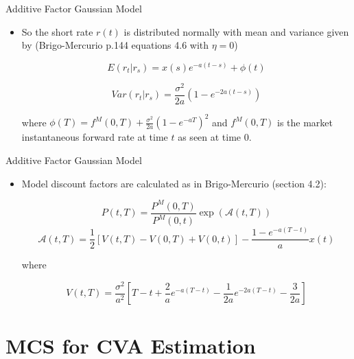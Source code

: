\documentclass[11pt]{beamer}
\begin{document}
\begin{frame}{Additive Factor Gaussian Model}
\begin{itemize}
\item So the short rate $r(t)$ is distributed normally with mean and variance given by (Brigo-Mercurio p.144 equations 4.6 with $\eta = 0$)

$$
E(r_t \vert r_s)= x(s) e^{-a(t-s)} + \phi(t)
$$

$$
Var(r_t \vert r_s) = \frac{\sigma^2}{2a} \left( 1-e^{-2a(t-s)} \right)
$$

where $\phi(T) = f^M(0,T) + \frac{\sigma^2}{2a} \left( 1-e^{-aT} \right)^2$ and $f^M(0,T)$ is the market instantaneous forward rate at time $t$ as seen at time $0$.
\end{itemize}
\end{frame}
\begin{frame}{Additive Factor Gaussian Model}
\begin{itemize}
\item Model discount factors are calculated as in Brigo-Mercurio (section 4.2): 

$$P(t,T)=\frac{P^M(0,T)}{P^M(0,t)}\exp\left( \mathcal{A}(t,T) \right) $$ 
$$\mathcal{A}(t,T) = \frac{1}{2} \left[ V(t,T) - V(0,T) + V(0,t) \right] - \frac{1-e^{-a(T-t)}}{a}x(t)
$$ 

where

$$V(t,T) = \frac{\sigma^2}{a^2} \left[
T-t+\frac{2}{a}e^{-a(T-t)}-\frac{1}{2a} e^{-2a(T-t)} - \frac{3}{2a}
\right]
$$
\end{itemize}
\end{frame}
\section{MCS for CVA Estimation}
\end{document}
